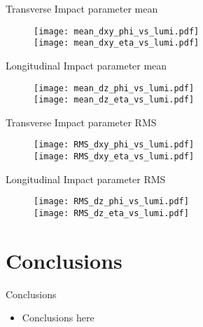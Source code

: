 \documentclass{beamer}
\begin{document}
\begin{frame}{Transverse Impact parameter mean}
  \begin{figure}
    \centering
    \texttt{[image: mean\_dxy\_phi\_vs\_lumi.pdf]}\\
    \texttt{[image: mean\_dxy\_eta\_vs\_lumi.pdf]}
  \end{figure}
\end{frame}

\begin{frame}{Longitudinal Impact parameter mean}
  \begin{figure}
    \centering
    \texttt{[image: mean\_dz\_phi\_vs\_lumi.pdf]}\\
    \texttt{[image: mean\_dz\_eta\_vs\_lumi.pdf]}
  \end{figure}
\end{frame}

\begin{frame}{Transverse Impact parameter RMS}
  \begin{figure}
    \centering
    \texttt{[image: RMS\_dxy\_phi\_vs\_lumi.pdf]}\\
    \texttt{[image: RMS\_dxy\_eta\_vs\_lumi.pdf]}
  \end{figure}
\end{frame}

\begin{frame}{Longitudinal Impact parameter RMS}
  \begin{figure}
    \centering
    \texttt{[image: RMS\_dz\_phi\_vs\_lumi.pdf]}\\
    \texttt{[image: RMS\_dz\_eta\_vs\_lumi.pdf]}
  \end{figure}
\end{frame}


\section{Conclusions}
\begin{frame}{Conclusions}
{
\begin{itemize}
\item Conclusions here
\end{itemize}
}
\end{frame} 
\end{document}
